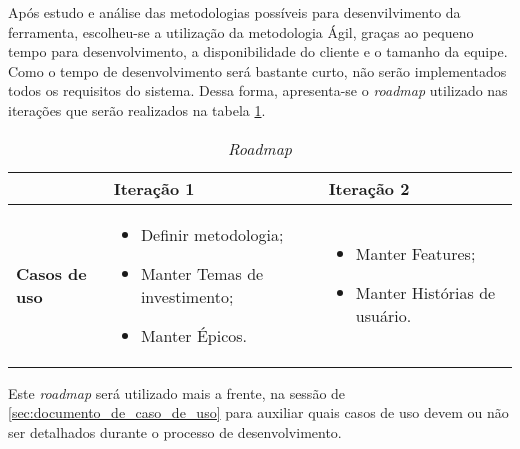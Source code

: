 Após estudo e análise das metodologias possíveis para desenvilvimento da ferramenta, escolheu-se a utilização da metodologia Ágil, graças ao pequeno tempo para desenvolvimento, a disponibilidade do cliente e o tamanho da equipe. Como o tempo de desenvolvimento será bastante curto, não serão implementados todos os requisitos do sistema. Dessa forma, apresenta-se o \textit{roadmap} utilizado nas iterações que serão realizados na tabela \ref{tab:primeiro_roadmap}.

\vspace{5mm}
\begin{table}[h]
\centering
\begin{tabular}{p{1cm}|p{6cm}|p{}|}

\cline{2-3} &
\textbf{Iteração 1} &
\textbf{Iteração 2}
\\ \hline
\multicolumn{1}{|p{1cm}|}{\textbf{Casos de uso}} &
\begin{itemize}
 	\item Definir metodologia;
 	\item Manter Temas de investimento;
	\item Manter Épicos.
\end{itemize} &
\begin{itemize}
 	\item Manter Features;
	\item Manter Histórias de usuário.
 \end{itemize} 
 \\ \hline
\end{tabular}
\caption{\textit{Roadmap}}
\label{tab:primeiro_roadmap}
\end{table}

Este \textit{roadmap} será utilizado mais a frente, na sessão de \ref{sec:documento_de_caso_de_uso} para auxiliar quais casos de uso devem ou não ser detalhados durante o processo de desenvolvimento.